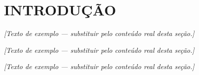 \section{INTRODUÇÃO} \label{sec:intro}
\textit{[Texto de exemplo --- substituir pelo conteúdo real desta seção.]} \cite{exemploArtigo}

\textit{[Texto de exemplo --- substituir pelo conteúdo real desta seção.]} \cite{exemploLivro}

\textit{[Texto de exemplo --- substituir pelo conteúdo real desta seção.]} \cite{exemploWeb}